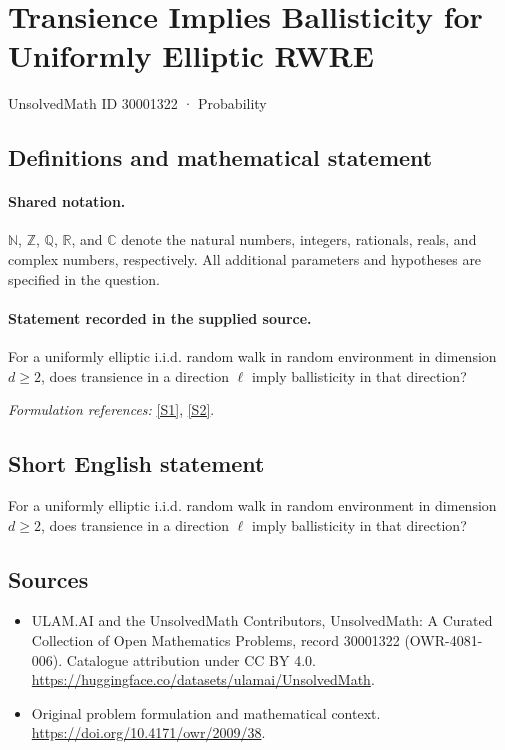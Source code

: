 \documentclass[11pt]{article}
\newcommand{\sref}[2]{\hyperlink{source:#1:#2}{[S#2]}}
\begin{document}
\setcounter{section}{30001321}
\section{Transience Implies Ballisticity for Uniformly Elliptic RWRE}\label{30001322}
{\small UnsolvedMath ID 30001322 · Probability}
\subsection{Definitions and mathematical statement}

\paragraph{Shared notation.}$\mathbb N$, $\mathbb Z$, $\mathbb Q$, $\mathbb R$, and $\mathbb C$ denote the natural numbers, integers, rationals, reals, and complex numbers, respectively. All additional parameters and hypotheses are specified in the question.


\paragraph{Statement recorded in the supplied source.}
For a uniformly elliptic i.i.d. random walk in random environment in dimension $d\geq2$, does transience in a direction $\ell$ imply ballisticity in that direction?
\par\smallskip\textit{Formulation references:} \sref{30001322}{1}, \sref{30001322}{2}.
\subsection{Short English statement}
For a uniformly elliptic i.i.d. random walk in random environment in dimension $d\geq2$, does transience in a direction $\ell$ imply ballisticity in that direction?
\subsection{Sources}
\begin{itemize}
\item[\hypertarget{source:30001322:1}{S1}] ULAM.AI and the UnsolvedMath Contributors, UnsolvedMath: A Curated Collection of Open Mathematics Problems, record 30001322 (OWR-4081-006). Catalogue attribution under CC BY 4.0.
\url{https://huggingface.co/datasets/ulamai/UnsolvedMath}.
\item[\hypertarget{source:30001322:2}{S2}] Original problem formulation and mathematical context.
\url{https://doi.org/10.4171/owr/2009/38}.
\end{itemize}
\label{end:30001322}
\end{document}
